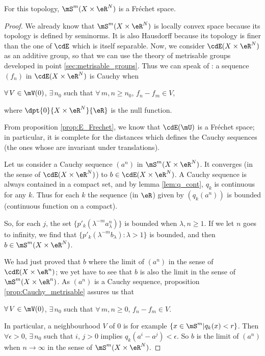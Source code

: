 \begin{proposition}
For this topology, $\mS^m(X\times\eR^N)$ is a Fréchet space.
\end{proposition}
\begin{proof}
We already know that $\mS^m(X\times\eR^N)$ is locally convex space because its topology is defined by seminorms. It is also Hausdorff because its topology is finer than the one of $\cdE$ which is itself separable. Now, we consider $\cdE(X\times \eR^N)$ as an additive group, so that we can use the theory of metrisable groups developed in point \ref{sec:metrisable_groups}. Thus we can speak of : a sequence $(f_n)$ 
in $\cdE(X\times \eR^N)$ is Cauchy when 

$\forall\,V\in\mV(0)$, $\exists\,n_0$ such that $\forall\,m,n\geq n_0$, $f_n-f_m\in V$,

\noindent where $\dpt{0}{X\times \eR^N}{\eR}$ is the null function.

From proposition \ref{prop:E_Frechet}, we know that $\cdE(\mU)$ is a Fréchet space; in particular, it is complete for the distances which defines the Cauchy sequences (the ones whose are invariant under translations).

Let us consider a Cauchy sequence $(a^n)$ in $\mS^m(X\times\eR^N)$. It converges (in the sense of $\cdE(X\times \eR^N)$) to $b\in\cdE(X\times \eR^N)$. A Cauchy sequence is always contained in a compact set, and by lemma \ref{lem:q_cont}, $q_k$ is continuous for any $k$. Thus for each $k$ the sequence (in $\eR$) given by $(q_k(a^n))$ is bounded (continuous function on a compact).

So, for each $j$, the set $\{p'_k(\lambda^{-m}a^n_{\lambda})\}$ is bounded when $\lambda,n\geq 1$. If we let $n$ goes to infinity, we find that $\{p'_k(\lambda^{-m}b_{\lambda}):\lambda>1\}$ is bounded, and then $b\in\mS^m(X\times\eR^N)$.

We had just proved that $b$ where the limit of $(a^n)$ in the sense of $\cdE(X\times\eR^n)$; we yet have to see that $b$ is also the limit in the sense of $\mS^m(X\times\eR^n)$. As $(a^n)$ is a Cauchy sequence, proposition \ref{prop:Cauchy_metrisable} assures us that

$\forall\,V\in\mV(0)$, $\exists\,n_0$ such that $\forall\,m,n\geq 0$, $f_n-f_m\in V$.

\noindent In particular, a neighbourhood $V$ of $0$ is for example $\{x\in\mS^m|q_k(x)<r\}$. Then $\forall\epsilon>0$, $\exists\,n_0$ such that $i$, $j>0$ implies $q_k(a^i-a^j)<\epsilon$. So $b$ is the limit of $(a^n)$ when $n\to\infty$ in the sense of $\mS^m(X\times\eR^N)$.

\end{proof}

